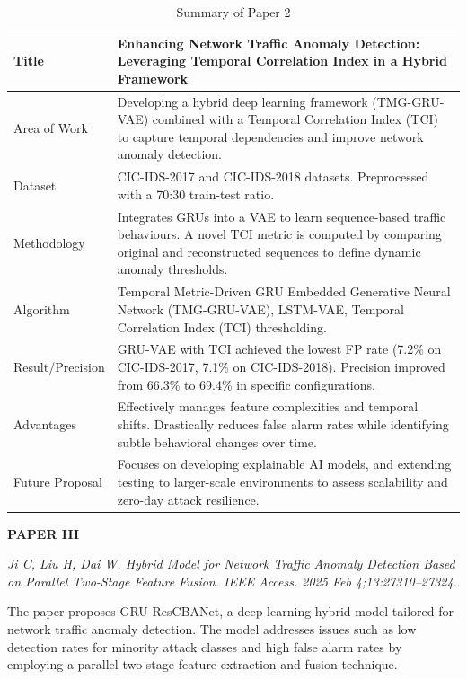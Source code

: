 \documentclass[12pt,a4paper]{report}
\begin{document}
\begin{table}[H]
\centering
\renewcommand{\arraystretch}{1.3}
\begin{tabularx}{\textwidth}{|>{\centering\arraybackslash}p{3.2cm}|X|}
\hline
Title & Enhancing Network Traffic Anomaly Detection: Leveraging Temporal Correlation Index in a Hybrid Framework \\
\hline
Area of Work & Developing a hybrid deep learning framework (TMG-GRU-VAE) combined with a Temporal Correlation Index (TCI) to capture temporal dependencies and improve network anomaly detection. \\
\hline
Dataset & CIC-IDS-2017 and CIC-IDS-2018 datasets. Preprocessed with a 70:30 train-test ratio. \\
\hline
Methodology & Integrates GRUs into a VAE to learn sequence-based traffic behaviours. A novel TCI metric is computed by comparing original and reconstructed sequences to define dynamic anomaly thresholds. \\
\hline
Algorithm & Temporal Metric-Driven GRU Embedded Generative Neural Network (TMG-GRU-VAE), LSTM-VAE, Temporal Correlation Index (TCI) thresholding. \\
\hline
Result/Precision & GRU-VAE with TCI achieved the lowest FP rate (7.2\% on CIC-IDS-2017, 7.1\% on CIC-IDS-2018). Precision improved from 66.3\% to 69.4\% in specific configurations. \\
\hline
Advantages & Effectively manages feature complexities and temporal shifts. Drastically reduces false alarm rates while identifying subtle behavioral changes over time. \\
\hline
Future Proposal & Focuses on developing explainable AI models, and extending testing to larger-scale environments to assess scalability and zero-day attack resilience. \\
\hline
\end{tabularx}
\caption{Summary of Paper 2}
\label{tab:paper2}
\end{table}

\newpage
\textbf{PAPER III}

\textit{Ji C, Liu H, Dai W. Hybrid Model for Network Traffic Anomaly Detection Based on Parallel Two-Stage Feature Fusion. IEEE Access. 2025 Feb 4;13:27310--27324.}

The paper proposes GRU-ResCBANet, a deep learning hybrid model tailored for network traffic anomaly detection. The model addresses issues such as low detection rates for minority attack classes and high false alarm rates by employing a parallel two-stage feature extraction and fusion technique.
\end{document}
